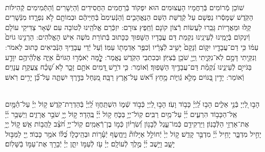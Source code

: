 \documentclass[twoside, openany, parskip=half, 11pt]{book}
\begin{document}
\\
שׁוֹכֵן מְֿרוֹמִים בְּֿרַחֲמָיו הָעֲצוּמִים הוּא יִפְקוֹד בְּֿרַחֲמִים הַחֲסִידִים וְֿהַיְשָׁרִים וְֿהַתְּֿמִימִים קְֿהִילּוֹת הַקֹּֽדֶשׁ שֶׁמָּסְֿרוּ נַפְשָׁם עַל קְֿדֻשַּׁת הַשֵּׁם הַנֶּאֱהָבִ֤ים וְֿהַנְּֿעִימִם֙ בְּֿחַיֵּיהֶ֔ם וּבְמוֹתָ֖ם לֹ֣א נִפְרָ֑דוּ׃ מִנְּֿשָׁרִים קַֽלּוּ וּמֵאֲרָיוֹת גָּבֵֽרוּ לַעֲשׂוֹת רְֿצוֹן קוֹנָם וְֿחֵֽפֶץ צוּרָם: יִזְכְּֿרֵם אֱלֹהֵֽינוּ לְֿטוֹבָה עִם שְֿׁאָר צַדִּיקֵי עוֹלָם וְֿיִנְקוֹם בְּֿיָמֵֽינוּ לְֿעֵינֵֽינוּ נִקְמַת דַּם עֲבָדָיו הַשָּׁפוּךְ כַּכָּתוּב בְּֿתוֹרַת מֹשֶׁה אִישׁ הָאֱלֹהִים: הַרְנִ֤ינוּ גוֹיִם֙ עַמּ֔וֹ כִּ֥י דַם־עֲבָדָ֖יו יִקּ֑וֹם וְֿנָקָם֙ יָשִׁ֣יב לְֿצָרָ֔יו וְֿכִפֶּ֥ר אַדְמָת֖וֹ עַמּֽוֹ׃ וְֿעַל יְֿדֵי עֲבָדֶֽיךָ הַנְּֿבִיאִים כָּתוּב לֵאמֹר: וְנִקֵּ֖יתִי דָּמָ֣ם לֹֽא־נִקֵּ֑יתִי וַֽיְיָ֖ שֹׁכֵ֥ן בְּֿצִיּֽוֹן׃ וּבְכִתְבֵי הַקֹּֽדֶשׁ נֶאֱמַר: לׇׇׇׇׇׇָ֤מָּה יֹֽאמְֿר֣וּ הַגּוֹיִם֘ אַיֵּ֢ה אֱלֹֽהֵ֫יהֶ֥ם יִוָּדַ֣ע בַּגֹּייִ֣ם לְֿעֵינֵ֑ינוּ נִ֝קְמַ֗ת דַּם־עֲבָדֶ֥יךָ הַשָּׁפֽוּךְ׃ וְֿאוֹמֵר: כִּ֤י דֹרֵ֣שׁ דָּ֭מִים אֹתָ֣ם זָכָ֑ר לֹ֥א שָׁ֝כַ֗ח צַֽעֲקַ֥ת עֲנָוִֽים׃ וְֿאוֹמֵר: יָדִ֣ין בַּ֭גּוֹיִם מָלֵ֣א גְֿוִיּ֑וֹת מָ֥חַץ רֹ֝֗אשׁ עַל־אֶ֥רֶץ רַבָּֽה׃ מִ֭נַּחַל בַּדֶּ֣רֶךְ יִשְׁתֶּ֑ה עַל־כֵּ֝֗ן יָרִ֥ים רֹֽאשׁ׃



\sepline

\ashrei

\yehalelu

\\
%
הָב֣וּ לַ֭יְיָ בְּֿנֵ֣י אֵלִ֑ים הָב֥וּ לַֽ֝יְיָ֗ כָּב֥וֹד וָעֹֽז׃
הָב֣וּ לַ֭יְיָ כְּֿב֣וֹד שְֿׁמ֑וֹ הִשְׁתַּֽחֲו֥וּ לַֽ֝יְיָ֗ בְּֿהַדְרַת־קֹֽדֶשׁ׃
ק֥וֹל יְיָ֗ עַל־הַ֫מָּ֥יִם אֵֽל־הַכָּב֥וֹד הִרְעִ֑ים יְ֜יָ֗ עַל־מַ֥יִם רַבִּֽים׃
קֽוֹל־יְיָ֥ בַּכֹּ֑חַ ק֥וֹל יְ֜יָ֗ בֶּֽהָדָר׃
ק֣וֹל יְ֖יָ֥ שֹׁבֵ֣ר אֲרָזִ֑ים וַיְשַׁבֵּ֥ר יְ֜יָ֗ אֶת־אַרְזֵ֥י הַלְּֿבָנֽוֹן׃
וַיַּרְקִידֵ֥ם כְּֿמוֹ־עֵ֑גֶל לְֿבָנ֥וֹן וְֿ֝שִׂרְי֗וֹן כְּֿמ֣וֹ בֶן־רְֿאֵמִֽים׃
קֽוֹל־יְיָ֥ חֹ֝צֵ֗ב לַֽהֲב֥וֹת אֵֽשׁ׃
ק֣וֹל יְ֖יָ֥ יָחִ֣יל מִדְבָּ֑ר יָחִ֥יל יְ֜יָ֗ מִדְבַּ֣ר קָדֵֽשׁ׃
ק֣וֹל יְיָ֙ יְֿחוֹלֵ֣ל אַיָּלוֹת֘ וַיֶּֽחֱשׂ֢ף יְֿעָ֫ר֥וֹת וּבְהֵֽיכָל֑וֹ כֻּ֝לּ֗וֹ אֹמֵ֥ר כָּבֽוֹד׃
יְ֖יָ לַמַּבּ֣וּל יָשָׁ֑ב וַיֵּ֥שֶׁב יְ֜יָ֗ מֶ֣לֶךְ לְֿעוֹלָֽם׃
יְיָ֗ עֹ֖ז לְֿעַמּ֣וֹ יִתֵּ֑ן יְיָ֓ יְֿבָרֵ֖ךְ אֶת־עַמּ֣וֹ בַֿשָּׁלֽוֹם׃
\end{document}

